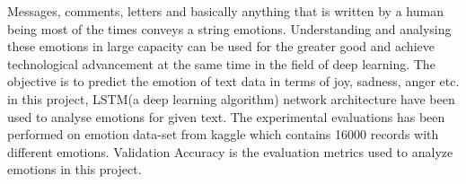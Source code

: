 Messages, comments, letters and basically anything that is written by a human being most of the times conveys a string emotions. Understanding and analysing these emotions in large capacity can be used for the greater good and achieve technological advancement at the same time in the field of deep learning. The objective is to predict the emotion of text data in terms of joy, sadness, anger etc. in this project, LSTM(a deep learning algorithm) network architecture have been used to analyse emotions for given text. The experimental evaluations has been performed on emotion data-set from kaggle which contains 16000 records with different emotions. Validation Accuracy is the evaluation metrics used to analyze emotions in this project.
\endinput

